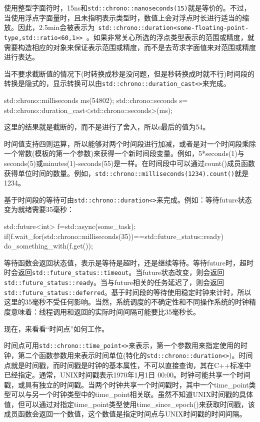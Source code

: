 使用整型字面符时，15ns和\texttt{std::chrono::nanoseconds(15)}就是等价的。不过，当使用浮点字面量时，且未指明表示类型时，数值上会对浮点时长进行适当的缩放。因此，2.5min会被表示为\texttt{ std::chrono::duration<some-floating-point-type,std::ratio<60,1>> }。如果非常关心所选的浮点类型表示的范围或精度，就需要构造相应的对象来保证表示范围或精度，而不是去苛求字面值来对范围或精度进行表达。

当不要求截断值的情况下(时转换成秒是没问题，但是秒转换成时就不行)时间段的转换是隐式的，显示转换可以由\texttt{std::chrono::duration\_cast<>}来完成。

\begin{cpp}
std::chrono::milliseconds ms(54802);
std::chrono::seconds s=
       std::chrono::duration_cast<std::chrono::seconds>(ms);
\end{cpp}

这里的结果就是截断的，而不是进行了舍入，所以s最后的值为54。

时间值支持四则运算，所以能够对两个时间段进行加减，或者是对一个时间段乘除一个常数(模板的第一个参数)来获得一个新时间段变量。例如，5*seconds(1)与seconds(5)或minutes(1)-seconds(55)是一样。在时间段中可以通过count()成员函数获得单位时间的数量。例如，\texttt{std::chrono::milliseconds(1234).count()}就是1234。

基于时间段的等待可由\texttt{std::chrono::duration<>}来完成。例如：等待future状态变为就绪需要35毫秒：

\begin{cpp}
std::future<int> f=std::async(some_task);
if(f.wait_for(std::chrono::milliseconds(35))==std::future_status::ready)
  do_something_with(f.get());
\end{cpp}

等待函数会返回状态值，表示是等待是超时，还是继续等待。等待future时，超时时会返回\texttt{std::future\_status::timeout}。当future状态改变，则会返回\texttt{std::future\_status::ready}。当与future相关的任务延迟了，则会返回\texttt{std::future\_status::deferred}。基于时间段的等待使用稳定时钟来计时，所以这里的35毫秒不受任何影响。当然，系统调度的不确定性和不同操作系统的时钟精度意味着：线程调用和返回的实际时间间隔可能要比35毫秒长。

现在，来看看“时间点”如何工作。


时间点可用\texttt{std::chrono::time\_point<>}来表示，第一个参数用来指定使用的时钟，第二个函数参数用来表示时间单位(特化的\texttt{std::chrono::duration<>})。时间点就是时间戳，而时间戳是时钟的基本属性，不可以直接查询，其在C++标准中已经指定。通常，UNIX时间戳表示1970年1月1日 00:00。时钟可能共享一个时间戳，或具有独立的时间戳。当两个时钟共享一个时间戳时，其中一个time\_point类型可以与另一个时钟类型中的time\_point相关联。虽然不知道UNIX时间戳的具体值，但可以通过对指定time\_point类型使用time\_since\_epoch()来获取时间戳，该成员函数会返回一个数值，这个数值是指定时间点与UNIX时间戳的时间间隔。

